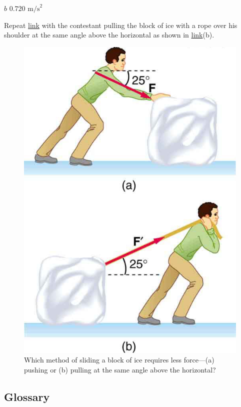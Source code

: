 \documentclass[
]{book}
\begin{document}
\(b\) \({0\text{.}\text{720\ m}\text{/s}^{2}}{}\)

\hypertarget{fs-id1529666}{}
\leavevmode{}%
Repeat \protect\hyperlink{fs-id1531145}{link} with the contestant
pulling the block of ice with a rope over his shoulder at the same angle
above the horizontal as shown in
\protect\hyperlink{import-auto-id1165298619770}{link}(b).

\begin{figure}
\hypertarget{import-auto-id1165298619770}{%
\centering
\includegraphics{images/Figure_06_01_07a.jpg}
\caption{Which method of sliding a block of ice requires less force---(a)
pushing or (b) pulling at the same angle above the
horizontal?}\label{import-auto-id1165298619770}
}
\end{figure}

\hypertarget{glossary-17}{%
\subsection{Glossary}\label{glossary-17}}
\end{document}
